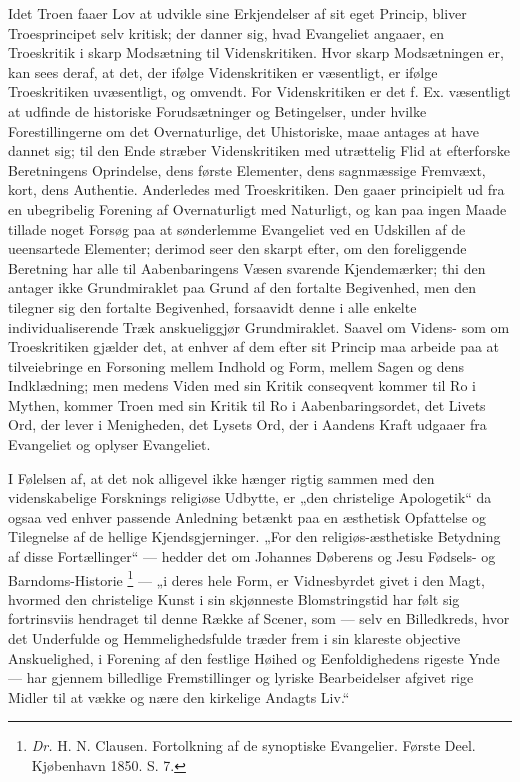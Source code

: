\documentclass[12pt]{book}
\newcommand{\opage}[1]{\marginnote{\footnotesize\textit{[#1]}}}
\begin{document}
Idet Troen faaer Lov at udvikle sine Erkjendelser af
sit eget Princip, bliver Troesprincipet selv kritisk; der danner
sig, hvad Evangeliet angaaer, en Troeskritik i skarp Modsætning
til Videnskritiken. Hvor skarp Modsætningen er, kan
sees deraf, at det, der ifølge Videnskritiken er væsentligt, er
ifølge Troeskritiken uvæsentligt, og omvendt. For Videnskritiken
er det f. Ex. væsentligt at udfinde de historiske Forudsætninger
og Betingelser, under hvilke Forestillingerne om
det Overnaturlige, det Uhistoriske, maae antages at have
dannet sig; til den Ende stræber Videnskritiken med utrættelig
Flid at efterforske Beretningens Oprindelse, dens første
Elementer, dens sagnmæssige Fremvæxt, kort, dens Authentie.
Anderledes med Troeskritiken. Den gaaer principielt ud
fra en ubegribelig Forening af Overnaturligt med Naturligt,
og kan paa ingen Maade tillade noget Forsøg paa at sønderlemme
Evangeliet ved en Udskillen af de ueensartede Elementer;
derimod seer den skarpt efter, om den foreliggende
Beretning har alle til Aabenbaringens Væsen svarende Kjendemærker;
thi den antager ikke Grundmiraklet paa Grund af
den fortalte Begivenhed, men den tilegner sig den fortalte
Begivenhed, forsaavidt denne i alle enkelte individualiserende
Træk anskueliggjør Grundmiraklet. Saavel om Videns- som
om Troeskritiken gjælder det, at enhver af dem efter sit
\opage{57}\setcounter{footnote}{0}%
Princip maa arbeide paa at tilveiebringe en Forsoning mellem
Indhold og Form, mellem Sagen og dens Indklædning;
men medens Viden med sin Kritik conseqvent kommer til
Ro i Mythen, kommer Troen med sin Kritik til Ro i
Aabenbaringsordet, det Livets Ord, der lever i Menigheden,
det Lysets Ord, der i Aandens Kraft udgaaer fra Evangeliet
og oplyser Evangeliet.

I Følelsen af, at det nok alligevel ikke hænger rigtig
sammen med den videnskabelige Forsknings religiøse Udbytte,
er „den christelige Apologetik“ da ogsaa ved enhver
passende Anledning betænkt paa en æsthetisk Opfattelse og
Tilegnelse af de hellige Kjendsgjerninger. „For den religiøs-æsthetiske
Betydning af disse Fortællinger“ --- hedder det
om Johannes Døberens og Jesu Fødsels- og Barndoms-Historie%
\footnote{\textit{Dr.} H. N. Clausen. Fortolkning af de synoptiske Evangelier.
Første Deel. Kjøbenhavn 1850. S. 7.}
--- „i deres hele Form, er Vidnesbyrdet givet i
den Magt, hvormed den christelige Kunst i sin skjønneste
Blomstringstid har følt sig fortrinsviis hendraget til denne
Række af Scener, som --- selv en Billedkreds, hvor det
Underfulde og Hemmelighedsfulde træder frem i sin klareste
objective Anskuelighed, i Forening af den festlige Høihed og
Eenfoldighedens rigeste Ynde --- har gjennem billedlige Fremstillinger
og lyriske Bearbeidelser afgivet rige Midler til at
vække og nære den kirkelige Andagts Liv.“
\end{document}
